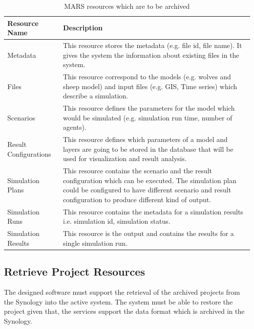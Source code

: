         \begin{table}[H]
            \centering
            \begin{tabular}{|p{3cm}|p{12cm}|}
                \hline
                    \textbf{Resource Name}  & \textbf{Description}\\
                \hline
                     Metadata & 
                     This resource stores the metadata (e.g. file id, file name). It gives the system the information about
                     existing files in the system. \\
                \hline
                     Files & 
                     This resource correspond to the models (e.g. wolves and sheep model) and input files (e.g. GIS, Time series) which describe a simulation. \\
                \hline
                     Scenarios & 
                     This resource defines the parameters for the model which would be simulated (e.g. simulation run time, number of agents). \\
                \hline
                     Result Configurations & 
                     This resource defines which parameters of a model and layers are going to be stored in the database that will be used for visualization
                     and result analysis.\\
                \hline
                     Simulation Plans & 
                     This resource contains the scenario and the result configuration which can be executed. The simulation plan could be configured to
                     have different scenario and result configuration to produce different kind of output.\\
                \hline
                     Simulation Runs & 
                     This resource contains the metadata for a simulation results i.e. simulation id, simulation status.\\
                \hline
                     Simulation Results & 
                     This resource is the output and contains the results for a single simulation run.\\
                \hline
            \end{tabular}
            \caption{MARS resources which are to be archived}
            \label{table: archivedMars}     
        \end{table} 
        
        
        
        \subsection{Retrieve Project Resources}    
            \label{ssec:retrieveAnalysis}
            The designed software must support the retrieval of the archived projects from the Synology into the active system. The
            system must be able to restore the project given that, the services support the data format which is archived in the Synology.
           
